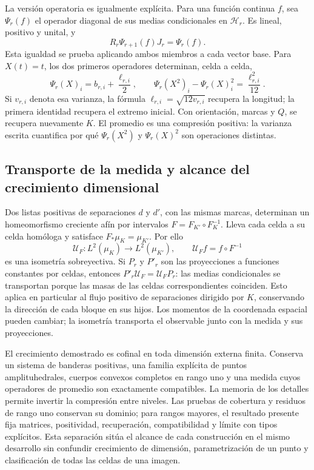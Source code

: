 La versión operatoria es igualmente explícita. Para una función continua
\(f\), sea \(\Psi_r(f)\) el operador diagonal de sus medias
condicionales en \(\mathcal H_r\). Es lineal, positivo y unital, y
\[
 R_r\Psi_{r+1}(f)J_r=\Psi_r(f).
\]
Esta igualdad se prueba aplicando ambos miembros a cada vector base.
Para \(X(t)=t\), los dos primeros operadores determinan, celda a
celda,
\[
 \Psi_r(X)_i=b_{r,i}+\frac{\ell_{r,i}}2,\qquad
 \Psi_r(X^2)_i-\Psi_r(X)_i^2=\frac{\ell_{r,i}^2}{12}.
\]
Si \(v_{r,i}\) denota esa varianza, la fórmula
\(\ell_{r,i}=\sqrt{12v_{r,i}}\) recupera la longitud; la
primera identidad recupera el extremo inicial. Con orientación, marcas y \(Q\),
se recupera nuevamente \(K\). El promedio es una compresión positiva:
la varianza escrita cuantifica por qué \(\Psi_r(X^2)\) y
\(\Psi_r(X)^2\) son operaciones distintas.

\subsection{Transporte de la medida y alcance del crecimiento dimensional}

Dos listas positivas de separaciones \(d\) y \(d'\), con las
mismas marcas, determinan un homeomorfismo creciente afín por intervalos
\(F=F_{K'}\circ F_K^{-1}\). Lleva cada celda a su celda homóloga
y satisface \(F_*\mu_K=\mu_{K'}\). Por ello
\[
 \mathcal U_F:L^2(\mu_K)\longrightarrow L^2(\mu_{K'}),
 \qquad\mathcal U_F f=f\circ F^{-1}
\]
es una isometría sobreyectiva. Si \(P_r\) y \(P'_r\) son las
proyecciones a funciones constantes por celdas, entonces
\(P'_r\mathcal U_F=\mathcal U_FP_r\): las medias condicionales
se transportan porque las masas de las celdas correspondientes coinciden.
Esto aplica en particular al flujo positivo de separaciones dirigido por
\(K\), conservando la dirección de cada bloque en sus hijos. Los
momentos de la coordenada espacial pueden cambiar; la isometría transporta
el observable junto con la medida y sus proyecciones.

El crecimiento demostrado es cofinal en toda dimensión externa finita.
Conserva un sistema de banderas positivas, una familia explícita de
puntos amplituhedrales, cuerpos convexos completos en rango uno y una
medida cuyos operadores de promedio son exactamente compatibles. La
memoria de los detalles permite invertir la compresión entre niveles.
Las pruebas de cobertura y residuos de rango uno conservan su dominio;
para rangos mayores, el resultado presente fija matrices, positividad,
recuperación, compatibilidad y límite con tipos explícitos. Esta
separación sitúa el alcance de cada construcción en el mismo desarrollo
sin confundir crecimiento de dimensión, parametrización de un punto y
clasificación de todas las celdas de una imagen.
